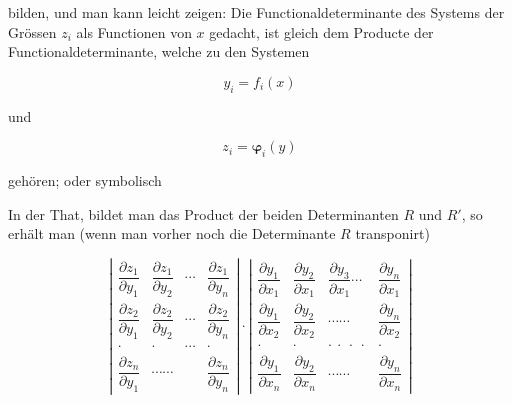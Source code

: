 bilden, und man kann leicht zeigen: Die Functionaldeterminante des
Systems der Grössen $z_i$ als Functionen von $x$ gedacht, ist gleich dem
Producte der Functionaldeterminante, welche zu den Systemen

\[
y_i = f_i(x)
\]

und

\[
z_i = \boldsymbol{\varphi}_i(y)
\]

gehören; oder symbolisch


In der That, bildet man das Product der beiden Determinanten $R$
und $R'$, so erhält man (wenn man vorher noch die Determinante $R$
transponirt)

\[
\left|
\begin{array}{cccc}
\dfrac{\partial z_1}{\partial y_1} & \dfrac{\partial z_1}{\partial y_2} & \cdots & \dfrac{\partial z_1}{\partial y_n} \\[2ex]
\dfrac{\partial z_2}{\partial y_1} & \dfrac{\partial z_2}{\partial y_2} & \cdots & \dfrac{\partial z_2}{\partial y_n} \\[2ex]
\cdot & \cdot & \cdots & \cdot \\[2ex]
\dfrac{\partial z_n}{\partial y_1} & \cdots\cdots & & \dfrac{\partial z_n}{\partial y_n}
\end{array}
\right|
\cdot
\left|
\begin{array}{cccc}
\dfrac{\partial y_1}{\partial x_1} & \dfrac{\partial y_2}{\partial x_1} & \dfrac{\partial y_3}{\partial x_1} \cdots & \dfrac{\partial y_n}{\partial x_1} \\[2ex]
\dfrac{\partial y_1}{\partial x_2} & \dfrac{\partial y_2}{\partial x_2} & \cdots\cdots & \dfrac{\partial y_n}{\partial x_2} \\[2ex]
\cdot & \cdot & \cdot\ \cdot\ \cdot\ \cdot & \cdot \\[2ex]
\dfrac{\partial y_1}{\partial x_n} & \dfrac{\partial y_2}{\partial x_n} & \cdots\cdots & \dfrac{\partial y_n}{\partial x_n}
\end{array}
\right|
\]

